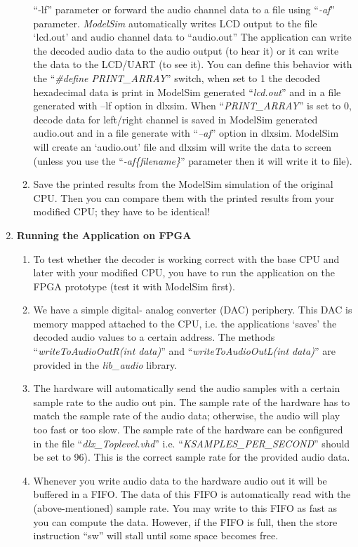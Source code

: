 \documentclass[
]{article}
\begin{document}
\begin{enumerate}
\begin{enumerate}
    ``-lf'' parameter or forward the audio channel data to a file using
    ``\emph{-af}'' parameter. \emph{ModelSim} automatically writes LCD
    output to the file `lcd.out' and audio channel data to ``audio.out''
    The application can write the decoded audio data to the audio output
    (to hear it) or it can write the data to the LCD/UART (to see it).
    You can define this behavior with the ``\emph{\#define
    PRINT\_ARRAY}'' switch, when set to 1 the decoded hexadecimal data
    is print in ModelSim generated ``\emph{lcd.out}'' and in a file
    generated with --lf option in dlxsim. When ``\emph{PRINT\_ARRAY}''
    is set to 0, decode data for left/right channel is saved in ModelSim
    generated audio.out and in a file generate with ``\emph{--af}''
    option in dlxsim. ModelSim will create an `audio.out' file and
    dlxsim will write the data to screen (unless you use the
    ``\emph{-af\{filename\}}'' parameter then it will write it to file).
  \item
    Save the printed results from the ModelSim simulation of the
    original CPU. Then you can compare them with the printed results
    from your modified CPU; they have to be identical!
  \end{enumerate}
\item
  \textbf{Running the Application on FPGA}

  \begin{enumerate}
  \def\labelenumii{\arabic{enumii}.}
  \item
    To test whether the decoder is working correct with the base CPU and
    later with your modified CPU, you have to run the application on the
    FPGA prototype (test it with ModelSim first).
  \item
    We have a simple digital- analog converter (DAC) periphery. This DAC
    is memory mapped attached to the CPU, i.e. the applications `saves'
    the decoded audio values to a certain address. The methods
    ``\emph{writeToAudioOutR(int data)}'' and
    ``\emph{writeToAudioOutL(int data)}'' are provided in the
    \emph{lib\_audio} library.
  \item
    The hardware will automatically send the audio samples with a
    certain sample rate to the audio out pin. The sample rate of the
    hardware has to match the sample rate of the audio data; otherwise,
    the audio will play too fast or too slow. The sample rate of the
    hardware can be configured in the file ``\emph{dlx\_Toplevel.vhd}''
    i.e. ``\emph{KSAMPLES\_PER\_SECOND}'' should be set to 96). This is
    the correct sample rate for the provided audio data.
  \item
    Whenever you write audio data to the hardware audio out it will be
    buffered in a FIFO. The data of this FIFO is automatically read with
    the (above-mentioned) sample rate. You may write to this FIFO as
    fast as you can compute the data. However, if the FIFO is full, then
    the store instruction ``sw'' will stall until some space becomes
    free.


\end{enumerate}
\end{enumerate}
\end{document}
